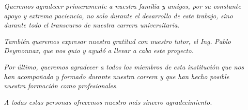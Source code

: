 \begin{center}

\textit{
  Queremos agradecer primeramente a nuestra familia y amigos, por su constante apoyo y extrema
  paciencia, no solo durante el desarrollo de este trabajo, sino durante todo el transcurso de
  nuestra carrera universitaria.}

\textit{También queremos expresar nuestra gratitud con nuestro tutor, el Ing. Pablo Deymonnaz,
que nos guio y ayudó a llevar a cabo este proyecto.}

\textit{Por último, queremos agradecer a todos los miembros de esta institución que nos han acompañado
y formado durante nuestra carrera y que han hecho posible nuestra formación como profesionales.}

\textit{A todas estas personas ofrecemos nuestro más sincero agradecimiento.}
\end{center}
